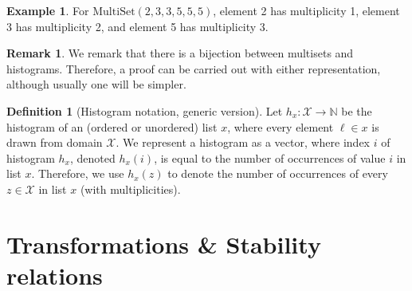 \documentclass[11pt,a4paper]{article}
\theoremstyle{definition}
\newtheorem{remark}[theorem]{Remark}
\newtheorem{definition}[theorem]{Definition}
\newtheorem{example}[theorem]{Example}
\newcommand{\MultiSet}{\mathrm{MultiSet}}
\newcommand{\todo}{{\textcolor{red}{TODO }}}
\begin{document}
\begin{example}
    For $\MultiSet(2, 3, 3, 5, 5, 5 )$, element 2 has multiplicity 1, element 3 has multiplicity 2, and element 5 has multiplicity 3.
\end{example}

\iffalse
\begin{definition}[Histogram notation, multiset version]
\label{defn:histogram}
    Let $h_x: \mathcal{X} \rightarrow \mathbb{N}$ be the histogram of a multiset $x \in \MultiSet(\mathcal{X} )$ for some domain $\mathcal{X}$. That is, $h_x(z)$ denotes the number of occurrences of $z \in \mathcal{X}$ in multiset $x$ (with multiplicities).
\end{definition}


\begin{definition}[Histogram notation, vector version]
    For any vector $v$ of elements of a domain \texttt{D}, $h_v$ denotes the histogram of $v$. That is, for every element $z$ of type \texttt{T}, $h_v(z)$ denotes the number of occurrences of $z \in \texttt{D}$ in the entries of vector $v$ (with multiplicities).
\end{definition}
\fi

\begin{remark}
    We remark that there is a bijection between multisets and histograms. Therefore, a proof can be carried out with either representation, although usually one will be simpler.
\end{remark}

\begin{definition}[Histogram notation, generic version]
\label{defn:histogram}
    Let $h_x: \mathcal{X} \rightarrow \mathbb{N}$ be the histogram of an (ordered or unordered) list $x$, where every element $\ell\in x$ is drawn from domain $\mathcal{X}$. We represent a histogram as a vector, where index $i$ of histogram $h_x$, denoted $h_x(i)$, is equal to the number of occurrences of value $i$ in list $x$. Therefore, we use $h_x(z)$ to denote the number of occurrences of every $z \in \mathcal{X}$ in list $x$ (with multiplicities).
\end{definition}


\section{Transformations \& Stability relations}
\end{document}
